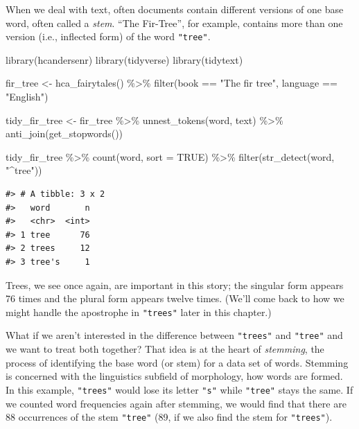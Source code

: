 \documentclass[
]{krantz}
\makeatletter
\newenvironment{Shaded}{\begin{snugshade}}{\end{snugshade}}
\newcommand{\AttributeTok}[1]{\textcolor[rgb]{0.77,0.63,0.00}{#1}}
\newcommand{\ConstantTok}[1]{\textcolor[rgb]{0.00,0.00,0.00}{#1}}
\newcommand{\FunctionTok}[1]{\textcolor[rgb]{0.00,0.00,0.00}{#1}}
\newcommand{\NormalTok}[1]{#1}
\newcommand{\OtherTok}[1]{\textcolor[rgb]{0.56,0.35,0.01}{#1}}
\newcommand{\SpecialCharTok}[1]{\textcolor[rgb]{0.00,0.00,0.00}{#1}}
\newcommand{\StringTok}[1]{\textcolor[rgb]{0.31,0.60,0.02}{#1}}
\newenvironment{kframe}{%
\medskip{}
\setlength{\fboxsep}{.8em}
 \def\at@end@of@kframe{}%
 \ifinner\ifhmode%
  \def\at@end@of@kframe{\end{minipage}}%
  \begin{minipage}{\columnwidth}%
 \fi\fi%
 \def\FrameCommand##1{\hskip\@totalleftmargin \hskip-\fboxsep
 \colorbox{shadecolor}{##1}\hskip-\fboxsep
     \hskip-\linewidth \hskip-\@totalleftmargin \hskip\columnwidth}%
 \MakeFramed {\advance\hsize-\width
   \@totalleftmargin\z@ \linewidth\hsize
   \@setminipage}}%
 {\par\unskip\endMakeFramed%
 \at@end@of@kframe}
\renewenvironment{Shaded}{\begin{kframe}}{\end{kframe}}
\makeatother
\begin{document}
When we deal with text, often documents contain different versions of one base word, often called a \emph{stem}. ``The Fir-Tree'', for example, contains more than one version (i.e., inflected form) of the word \texttt{"tree"}.

\begin{Shaded}
\begin{Highlighting}[]
\FunctionTok{library}\NormalTok{(hcandersenr)}
\FunctionTok{library}\NormalTok{(tidyverse)}
\FunctionTok{library}\NormalTok{(tidytext)}

\NormalTok{fir\_tree }\OtherTok{\textless{}{-}} \FunctionTok{hca\_fairytales}\NormalTok{() }\SpecialCharTok{\%\textgreater{}\%}
  \FunctionTok{filter}\NormalTok{(book }\SpecialCharTok{==} \StringTok{"The fir tree"}\NormalTok{,}
\NormalTok{         language }\SpecialCharTok{==} \StringTok{"English"}\NormalTok{)}

\NormalTok{tidy\_fir\_tree }\OtherTok{\textless{}{-}}\NormalTok{ fir\_tree }\SpecialCharTok{\%\textgreater{}\%}
  \FunctionTok{unnest\_tokens}\NormalTok{(word, text) }\SpecialCharTok{\%\textgreater{}\%}
  \FunctionTok{anti\_join}\NormalTok{(}\FunctionTok{get\_stopwords}\NormalTok{())}

\NormalTok{tidy\_fir\_tree }\SpecialCharTok{\%\textgreater{}\%}
  \FunctionTok{count}\NormalTok{(word, }\AttributeTok{sort =} \ConstantTok{TRUE}\NormalTok{) }\SpecialCharTok{\%\textgreater{}\%}
  \FunctionTok{filter}\NormalTok{(}\FunctionTok{str\_detect}\NormalTok{(word, }\StringTok{"\^{}tree"}\NormalTok{))}
\end{Highlighting}
\end{Shaded}

\begin{verbatim}
#> # A tibble: 3 x 2
#>   word       n
#>   <chr>  <int>
#> 1 tree      76
#> 2 trees     12
#> 3 tree's     1
\end{verbatim}

Trees, we see once again, are important in this story; the singular form appears 76 times and the plural form appears twelve times. (We'll come back to how we might handle the apostrophe in \texttt{"tree\textquotesingle{}s"} later in this chapter.)

What if we aren't interested in the difference between \texttt{"trees"} and \texttt{"tree"} and we want to treat both together? That idea is at the heart of \emph{stemming}, the process of identifying the base word (or stem) for a data set of words. Stemming is concerned with the linguistics subfield of morphology, how words are formed. In this example, \texttt{"trees"} would lose its letter \texttt{"s"} while \texttt{"tree"} stays the same. If we counted word frequencies again after stemming, we would find that there are 88 occurrences of the stem \texttt{"tree"} (89, if we also find the stem for \texttt{"tree\textquotesingle{}s"}).
\end{document}
